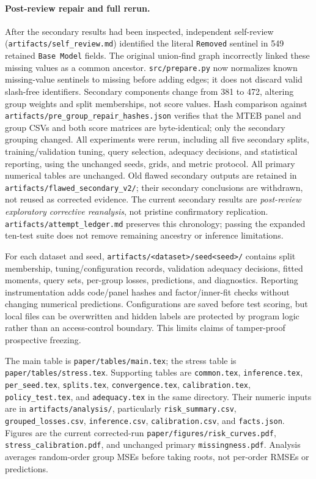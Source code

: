 \documentclass{article}
\begin{document}
\paragraph{Post-review repair and full rerun.} After the secondary results had been inspected, independent self-review (\texttt{artifacts/self\_review.md}) identified the literal \texttt{Removed} sentinel in 549 retained \texttt{Base Model} fields. The original union-find graph incorrectly linked these missing values as a common ancestor. \texttt{src/prepare.py} now normalizes known missing-value sentinels to missing before adding edges; it does not discard valid slash-free identifiers. Secondary components change from 381 to 472, altering group weights and split memberships, not score values. Hash comparison against \texttt{artifacts/pre\_group\_repair\_hashes.json} verifies that the MTEB panel and group CSVs and both score matrices are byte-identical; only the secondary grouping changed. All experiments were rerun, including all five secondary splits, training/validation tuning, query selection, adequacy decisions, and statistical reporting, using the unchanged seeds, grids, and metric protocol. All primary numerical tables are unchanged. Old flawed secondary outputs are retained in \texttt{artifacts/flawed\_secondary\_v2/}; their secondary conclusions are withdrawn, not reused as corrected evidence. The current secondary results are \emph{post-review exploratory corrective reanalysis}, not pristine confirmatory replication. \texttt{artifacts/attempt\_ledger.md} preserves this chronology; passing the expanded ten-test suite does not remove remaining ancestry or inference limitations.

For each dataset and seed, \texttt{artifacts/<dataset>/seed<seed>/} contains split membership, tuning/configuration records, validation adequacy decisions, fitted moments, query sets, per-group losses, predictions, and diagnostics. Reporting instrumentation adds code/panel hashes and factor/inner-fit checks without changing numerical predictions. Configurations are saved before test scoring, but local files can be overwritten and hidden labels are protected by program logic rather than an access-control boundary. This limits claims of tamper-proof prospective freezing.

The main table is \texttt{paper/tables/main.tex}; the stress table is \texttt{paper/tables/stress.tex}. Supporting tables are \texttt{common.tex}, \texttt{inference.tex}, \texttt{per\_seed.tex}, \texttt{splits.tex}, \texttt{convergence.tex}, \texttt{calibration.tex}, \texttt{policy\_test.tex}, and \texttt{adequacy.tex} in the same directory. Their numeric inputs are in \texttt{artifacts/analysis/}, particularly \texttt{risk\_summary.csv}, \texttt{grouped\_losses.csv}, \texttt{inference.csv}, \texttt{calibration.csv}, and \texttt{facts.json}. Figures are the current corrected-run \texttt{paper/figures/risk\_curves.pdf}, \texttt{stress\_calibration.pdf}, and unchanged primary \texttt{missingness.pdf}. Analysis averages random-order group MSEs before taking roots, not per-order RMSEs or predictions.
\end{document}
